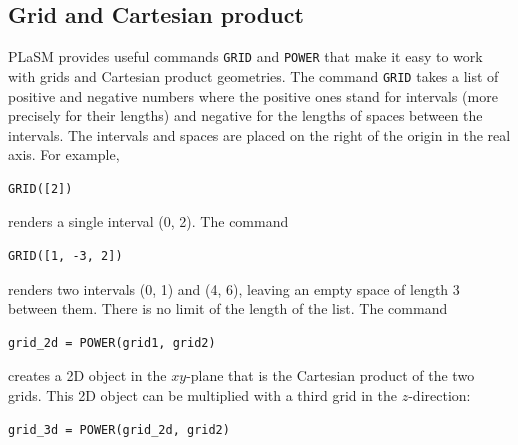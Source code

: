 \subsection{Grid and Cartesian product}\label{subsec:grids}

PLaSM provides useful commands {\tt GRID} and {\tt POWER} that 
make it easy to work with grids and Cartesian product geometries. The command
{\tt GRID} takes a list of positive and negative numbers where the 
positive ones stand for intervals (more precisely for their lengths) 
and negative for the lengths of spaces between the intervals. The 
intervals and spaces are placed on the right of the origin in the 
real axis. For example, \\

\begin{bbox}
\begin{verbatim}
GRID([2])
\end{verbatim}
\end{bbox}
\vspace{6mm}

\noindent
renders a single interval (0, 2). The command\\

\begin{bbox}
\begin{verbatim}
GRID([1, -3, 2])
\end{verbatim}
\end{bbox}
\vspace{6mm}

\noindent
renders two intervals (0, 1) and (4, 6), leaving an empty 
space of length 3 between them. There is no limit of the 
length of the list.
The command\\

\begin{bbox}
\begin{verbatim}
grid_2d = POWER(grid1, grid2)
\end{verbatim}
\end{bbox}
\vspace{6mm}

\noindent{}
creates a 2D object in the $xy$-plane that is the Cartesian 
product of the two grids. This 2D object can be multiplied 
with a third grid in the $z$-direction:

\begin{bbox}
\begin{verbatim}
grid_3d = POWER(grid_2d, grid2)
\end{verbatim}
\end{bbox}
\vspace{6mm}


